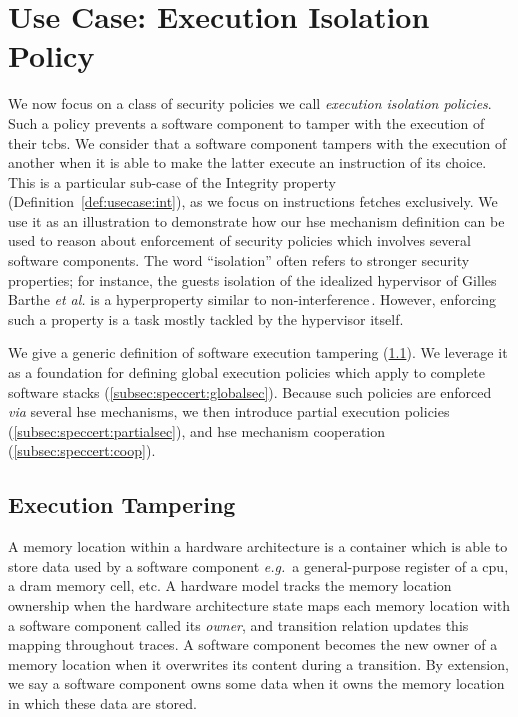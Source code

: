 \section{Use Case: Execution Isolation Policy}
\label{sec:speccert:usecase}

We now focus on a class of security policies we call \emph{execution isolation
  policies}.
%
Such a policy prevents a software component to tamper with the execution of
their \acp{tcb}.
%
We consider that a software component tampers with the execution of another when
it is able to make the latter execute an instruction of its choice.
%
This is a particular sub-case of the Integrity property
(Definition~\ref{def:usecase:int}), as we focus on instructions fetches
exclusively.
%
We use it as an illustration to demonstrate how our \ac{hse} mechanism
definition can be used to reason about enforcement of security policies which
involves several software components.
%
The word ``isolation'' often refers to stronger security properties; for
instance, the guests isolation of the idealized hypervisor of Gilles Barthe
\emph{et al.} is a hyperproperty similar to
non-interference\,\cite{barthe2011virtcert1}.
%
However, enforcing such a property is a task mostly tackled by the hypervisor
itself.

We give a generic definition of software execution tampering
(\ref{subsec:speccert:tampering}).
%
We leverage it as a foundation for defining global execution policies which
apply to complete software stacks (\ref{subsec:speccert:globalsec}).
%
Because such policies are enforced \emph{via} several \ac{hse} mechanisms, we
then introduce partial execution policies (\ref{subsec:speccert:partialsec}),
and \ac{hse} mechanism cooperation (\ref{subsec:speccert:coop}).

\subsection{Execution Tampering}
\label{subsec:speccert:tampering}
%
A memory location within a hardware architecture is a container which is able to
store data used by a software component \emph{e.g.}~a general-purpose register
of a \ac{cpu}, a \ac{dram} memory cell, etc.
%
A hardware model tracks the memory location ownership when the hardware
architecture state maps each memory location with a software component called
its \emph{owner}, and transition relation updates this mapping throughout
traces.
%
A software component becomes the new owner of a memory location when it
overwrites its content during a transition.
%
By extension, we say a software component owns some data when it owns the memory
location in which these data are stored.

